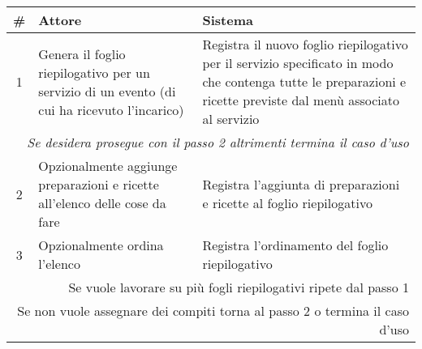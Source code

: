 \begin{table}[H]\centering
    \small
    \begin{tabular}{|c|p{7cm}|p{6.5cm}|}
        \hline\bfseries \# & \bfseries Attore                                                                                                                                              & \bfseries Sistema                                                                                                                                               \\\hline
        1                  & Genera il foglio riepilogativo per un servizio di un evento (di cui ha ricevuto l’incarico)                                                                   & Registra il nuovo foglio riepilogativo per il servizio specificato in modo che contenga tutte le preparazioni e ricette previste dal menù associato al servizio \\\hline
        \multicolumn{3}{|r|}{\textit{Se desidera prosegue con il passo 2 altrimenti termina il caso d’uso}}                                                                                                                                                                                                                                                  \\\hline
        2                  & Opzionalmente aggiunge preparazioni e ricette all’elenco delle cose da fare                                                                                   & Registra l’aggiunta di preparazioni e ricette al foglio riepilogativo                                                                                           \\\hline
        3                  & Opzionalmente ordina l’elenco                                                                                                                                 & Registra l’ordinamento del foglio riepilogativo                                                                                                                 \\\hline
        \multicolumn{3}{|r|}{Se vuole lavorare su più fogli riepilogativi ripete dal passo 1}                                                                                                                                                                                                                                                                \\
        \multicolumn{3}{|r|}{Se non vuole assegnare dei compiti torna al passo 2 o termina il caso d’uso}                                                                                                                                                                                                                                                    \\\hline

\end{tabular}
\end{table}
